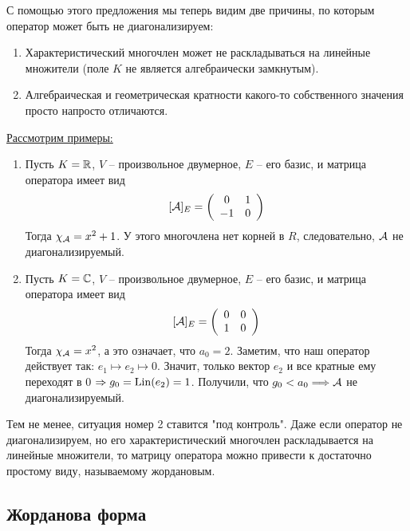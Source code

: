 С помощью этого предложения мы теперь видим две причины, по которым оператор может быть не диагонализируем:
\begin{enumerate}
    \item Характеристический многочлен может не раскладываться на линейные множители (поле $K$ не является алгебраически замкнутым).
    \item Алгебраическая и геометрическая кратности какого-то собственного значения просто напросто отличаются.
\end{enumerate}

\vspace*{4mm}

\underline{Рассмотрим примеры:}
$ $ \\
\begin{enumerate}
    \item Пусть $ K = \mathbb{R}$, $V$ -- произвольное двумерное, $E$ -- его базис, и матрица оператора имеет вид \[ [\mathcal{A}]_{E} = \left(\begin{array}{cc}
    0 & 1 \\ 
    -1 & 0
    \end{array}\right) \] 
    Тогда $\chi_{\mathcal{A}} = x^2 + 1$. 
    У этого многочлена нет корней в $R$, следовательно, $\mathcal{A}$ не диагонализируемый.

    \item Пусть $K = \mathbb{C}$, $V$ -- произвольное двумерное, $E$ -- его базис, и матрица оператора имеет вид
    \[ [\mathcal{A}]_{E} = \left(\begin{array}{cc}
        0 & 0 \\ 
        1 & 0
    \end{array}\right)\] 
    Тогда $\chi_{\mathcal{A}} = x^2$, а это означает, что $a_0 = 2$.
    Заметим, что наш оператор действует так: $e_1 \mapsto e_2 \mapsto 0$.
    Значит, только вектор $e_2$ и все кратные ему переходят в 0 $\Rightarrow g_0 = \operatorname{Lin}(e_2) = 1$.
    Получили, что $g_0 < a_0 \Longrightarrow \mathcal{A}$ не диагонализируемый.
\end{enumerate}

\vspace*{5mm}

Тем не менее, ситуация номер 2 ставится "под контроль".
Даже если оператор не диагонализируем, но его характеристический многочлен раскладывается на линейные множители, то матрицу оператора можно привести к достаточно простому виду, называемому жордановым.

\subsection{Жорданова форма}

